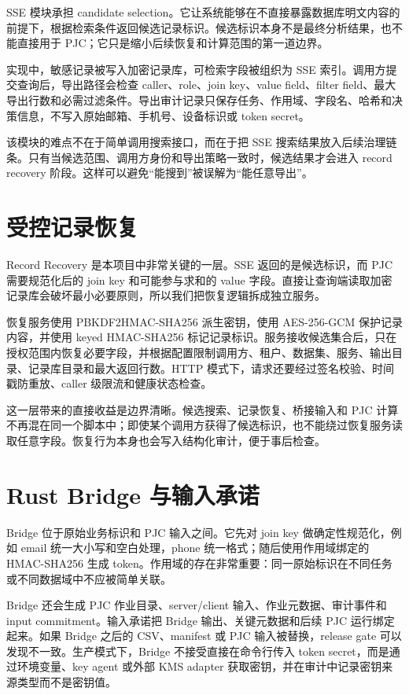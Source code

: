 \documentclass[UTF8,a4paper,12pt,oneside]{ctexrep}
\begin{document}
SSE 模块承担 candidate selection。它让系统能够在不直接暴露数据库明文内容的前提下，根据检索条件返回候选记录标识。候选标识本身不是最终分析结果，也不能直接用于 PJC；它只是缩小后续恢复和计算范围的第一道边界。

实现中，敏感记录被写入加密记录库，可检索字段被组织为 SSE 索引。调用方提交查询后，导出路径会检查 caller、role、join key、value field、filter field、最大导出行数和必需过滤条件。导出审计记录只保存任务、作用域、字段名、哈希和决策信息，不写入原始邮箱、手机号、设备标识或 token secret。

该模块的难点不在于简单调用搜索接口，而在于把 SSE 搜索结果放入后续治理链条。只有当候选范围、调用方身份和导出策略一致时，候选结果才会进入 record recovery 阶段。这样可以避免“能搜到”被误解为“能任意导出”。

\section{受控记录恢复}

Record Recovery 是本项目中非常关键的一层。SSE 返回的是候选标识，而 PJC 需要规范化后的 join key 和可能参与求和的 value 字段。直接让查询端读取加密记录库会破坏最小必要原则，所以我们把恢复逻辑拆成独立服务。

恢复服务使用 PBKDF2HMAC-SHA256 派生密钥，使用 AES-256-GCM 保护记录内容，并使用 keyed HMAC-SHA256 标记记录标识。服务接收候选集合后，只在授权范围内恢复必要字段，并根据配置限制调用方、租户、数据集、服务、输出目录、记录库目录和最大返回行数。HTTP 模式下，请求还要经过签名校验、时间戳防重放、caller 级限流和健康状态检查。

这一层带来的直接收益是边界清晰。候选搜索、记录恢复、桥接输入和 PJC 计算不再混在同一个脚本中；即使某个调用方获得了候选标识，也不能绕过恢复服务读取任意字段。恢复行为本身也会写入结构化审计，便于事后检查。

\section{Rust Bridge 与输入承诺}

Bridge 位于原始业务标识和 PJC 输入之间。它先对 join key 做确定性规范化，例如 email 统一大小写和空白处理，phone 统一格式；随后使用作用域绑定的 HMAC-SHA256 生成 token。作用域的存在非常重要：同一原始标识在不同任务或不同数据域中不应被简单关联。

Bridge 还会生成 PJC 作业目录、server/client 输入、作业元数据、审计事件和 input commitment。输入承诺把 Bridge 输出、关键元数据和后续 PJC 运行绑定起来。如果 Bridge 之后的 CSV、manifest 或 PJC 输入被替换，release gate 可以发现不一致。生产模式下，Bridge 不接受直接在命令行传入 token secret，而是通过环境变量、key agent 或外部 KMS adapter 获取密钥，并在审计中记录密钥来源类型而不是密钥值。
\end{document}
